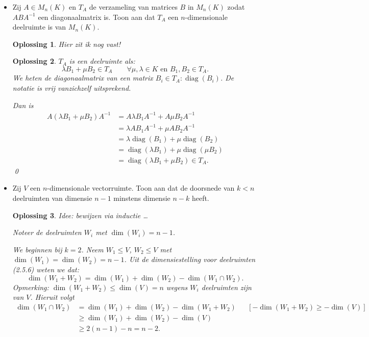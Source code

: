\documentclass[a4paper,12pt]{article}
\newtheorem{oplossing}{Oplossing}
\begin{document}
\begin{enumerate}
\begin{itemize}
    \item[(iii)] Zij $A \in M_n(K)$ en $T_A$ de verzameling van matrices $B$ in $M_n(K)$ zodat $ABA^{-1}$ een diagonaalmatrix is. Toon aan dat $T_A$ een $n$-dimensionale deelruimte is van $M_n(K)$.
    \begin{oplossing}
        Hier zit ik nog vast!
    \end{oplossing}
    \begin{oplossing}
        \(T_A\) is een deelruimte als:
        \[
        \lambda B_1 + \mu B_2 \in T_A \qquad \forall \mu, \lambda \in K \text{ en } B_1 , B_2 \in T_A.
        \]
        We heten de diagonaalmatrix van een matrix \(B_i \in T_A: \operatorname{diag}(B_i)\).
        De notatie is vrij vanzichzelf uitsprekend.

        Dan is
        \begin{align*}
            A \left(\lambda B_1 + \mu B_2\right) A^{-1}
            &= A \lambda B_1 A^{-1} + A \mu B_2 A^{-1} \\
            &=  \lambda A B_1 A^{-1} + \mu A  B_2 A^{-1} \\
            &=   \lambda \operatorname{diag}(B_1) + \mu \operatorname{diag}(B_2) \\
            &=  \operatorname{diag}(\lambda B_1) + \mu \operatorname{diag}( \mu B_2) \\
            &= \operatorname{diag}(\lambda B_1 + \mu B_2) \in T_A.
        \end{align*}\qed
    \end{oplossing}
    \item[(iv)] Zij $V$ een $n$-dimensionale vectorruimte. Toon aan dat de doorsnede van $k < n$ deelruimten van dimensie $n-1$ minstens dimensie $n-k$ heeft.

    \begin{oplossing}
        Idee: bewijzen via inductie \dots

        Noteer de deelruimten \(W_i\) met \(\dim (W_i) = n-1\).

        We beginnen bij \(k = 2\). Neem \(W_1 \le V \), \(W_2 \le V\) met \(\dim(W_1) = \dim(W_2) = n-1\).
        Uit de dimensiestelling voor deelruimten (2.5.6) weten we dat:
        \[
        \dim(W_1 +W_2) = \dim(W_1) + \dim (W_2) - \dim(W_1 \cap W_2).
        \]
        Opmerking: \(\dim(W_1 + W_2) \leq \dim(V) = n \) wegens \(W_i\) deelruimten zijn van \(V\).
        Hieruit volgt
        \begin{align*}
            \dim(W_1 \cap W_2)
            &= \dim(W_1) + \dim (W_2) - \dim(W_1 +W_2) && [- \dim(W_1 + W_2)\geq - \dim(V)] \\
            &\geq \dim(W_1) + \dim (W_2) - \dim(V) \\
            &\geq 2(n-1) -n = n-2.
        \end{align*}


\end{oplossing}
\end{itemize}
\end{enumerate}
\end{document}
